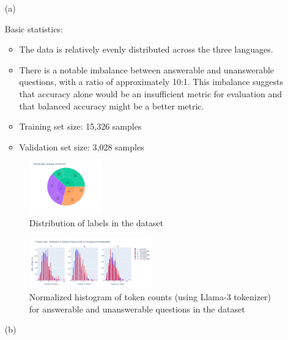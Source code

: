 \documentclass[11pt]{article}
\begin{document}
\begin{enumerate}
    \item[(a)] 

    Basic statistics:
    \begin{itemize}
        \item The data is relatively evenly distributed across the three languages.
        \item There is a notable imbalance between answerable and unanswerable questions, with a ratio of approximately 10:1. This imbalance suggests that accuracy alone would be an insufficient metric for evaluation and that balanced accuracy might be a better metric.
        \item Training set size: 15,326 samples
        \item Validation set size: 3,028 samples
    \end{itemize}

    \begin{figure}[ht]
        \centering
        \includegraphics[width=0.3\textwidth]{week1_a_dataset.png}
        \caption{Distribution of labels in the dataset}
        \label{fig:label_distribution}
    \end{figure}

    \begin{figure}[ht]
        \centering
        \includegraphics[width=0.5\textwidth]{week1_a_lang_token_distribution_normalized.png}
        \caption{Normalized histogram of token counts (using Llama-3 tokenizer) for answerable and unanswerable questions in the dataset}
        \label{fig:language_distribution}
    \end{figure}

    \item[(b)] 


\end{enumerate}
\end{document}
